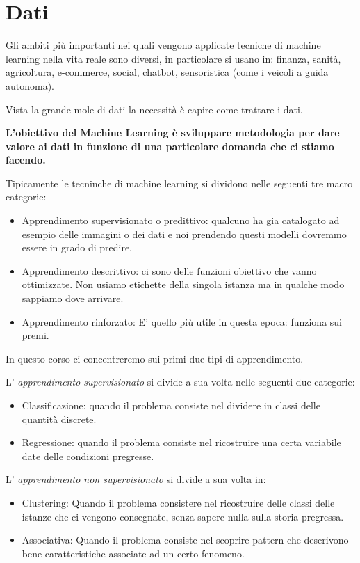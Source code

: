 \pagestyle{fancy}
\cfoot{\thepage}
\renewcommand{\footrulewidth}{0.25pt}


\section{Dati}
Gli ambiti più importanti nei quali vengono applicate tecniche di machine learning nella vita reale sono diversi, in particolare si usano in:
finanza, sanità, agricoltura, e-commerce, social, chatbot, sensoristica (come i veicoli a guida autonoma).

Vista la grande mole di dati la necessità è capire come trattare i dati.

\textbf{L'obiettivo del Machine Learning è sviluppare metodologia per dare valore ai dati in funzione di una particolare domanda che ci stiamo facendo.}

Tipicamente le tecninche di machine learning si dividono nelle seguenti tre macro categorie:
\begin{itemize}
	\item Apprendimento supervisionato o predittivo: qualcuno ha gia catalogato ad esempio delle immagini o dei dati e noi prendendo questi modelli dovremmo essere in grado di predire.
	\item Apprendimento descrittivo: ci sono delle funzioni obiettivo che vanno ottimizzate. Non usiamo etichette della singola istanza ma in qualche modo sappiamo dove arrivare.
	\item Apprendimento rinforzato: E' quello più utile in questa epoca: funziona sui premi.
\end{itemize}

In questo corso ci concentreremo sui primi due tipi di apprendimento.

L' \textit{apprendimento supervisionato} si divide a sua volta nelle seguenti due categorie:
\begin{itemize}
	\item Classificazione: quando il problema consiste nel dividere in classi delle quantità discrete.
	\item Regressione: quando il problema consiste nel ricostruire una certa variabile date delle condizioni pregresse.
\end{itemize}

L' \textit{apprendimento non supervisionato} si divide a sua volta in:
\begin{itemize}
	\item Clustering: Quando il problema consistere nel ricostruire delle classi delle istanze che ci vengono consegnate, senza sapere nulla sulla storia pregressa.
	\item Associativa: Quando il problema consiste nel scoprire pattern che descrivono bene caratteristiche associate ad un certo fenomeno.
\end{itemize}

